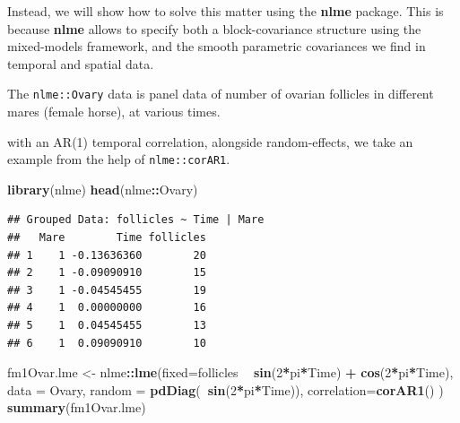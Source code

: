 \documentclass[]{book}
\newenvironment{Shaded}{\begin{snugshade}}{\end{snugshade}}
\newcommand{\DataTypeTok}[1]{\textcolor[rgb]{0.13,0.29,0.53}{#1}}
\newcommand{\DecValTok}[1]{\textcolor[rgb]{0.00,0.00,0.81}{#1}}
\newcommand{\KeywordTok}[1]{\textcolor[rgb]{0.13,0.29,0.53}{\textbf{#1}}}
\newcommand{\NormalTok}[1]{#1}
\newcommand{\OperatorTok}[1]{\textcolor[rgb]{0.81,0.36,0.00}{\textbf{#1}}}
\newcommand{\StringTok}[1]{\textcolor[rgb]{0.31,0.60,0.02}{#1}}
\theoremstyle{definition}
\theoremstyle{definition}
\theoremstyle{definition}
\theoremstyle{remark}
\begin{document}
Instead, we will show how to solve this matter using the \textbf{nlme} package.
This is because \textbf{nlme} allows to specify both a block-covariance structure using the mixed-models framework, and the smooth parametric covariances we find in temporal and spatial data.

The \texttt{nlme::Ovary} data is panel data of number of ovarian follicles in different mares (female horse), at various times.

with an AR(1) temporal correlation, alongside random-effects, we take an example from the help of \texttt{nlme::corAR1}.

\begin{Shaded}
\begin{Highlighting}[]
\KeywordTok{library}\NormalTok{(nlme)}
\KeywordTok{head}\NormalTok{(nlme}\OperatorTok{::}\NormalTok{Ovary)}
\end{Highlighting}
\end{Shaded}

\begin{verbatim}
## Grouped Data: follicles ~ Time | Mare
##   Mare        Time follicles
## 1    1 -0.13636360        20
## 2    1 -0.09090910        15
## 3    1 -0.04545455        19
## 4    1  0.00000000        16
## 5    1  0.04545455        13
## 6    1  0.09090910        10
\end{verbatim}

\begin{Shaded}
\begin{Highlighting}[]
\NormalTok{fm1Ovar.lme <-}\StringTok{ }\NormalTok{nlme}\OperatorTok{::}\KeywordTok{lme}\NormalTok{(}\DataTypeTok{fixed=}\NormalTok{follicles }\OperatorTok{~}\StringTok{ }\KeywordTok{sin}\NormalTok{(}\DecValTok{2}\OperatorTok{*}\NormalTok{pi}\OperatorTok{*}\NormalTok{Time) }\OperatorTok{+}\StringTok{ }\KeywordTok{cos}\NormalTok{(}\DecValTok{2}\OperatorTok{*}\NormalTok{pi}\OperatorTok{*}\NormalTok{Time), }
                   \DataTypeTok{data =}\NormalTok{ Ovary, }
                   \DataTypeTok{random =} \KeywordTok{pdDiag}\NormalTok{(}\OperatorTok{~}\KeywordTok{sin}\NormalTok{(}\DecValTok{2}\OperatorTok{*}\NormalTok{pi}\OperatorTok{*}\NormalTok{Time)), }
                   \DataTypeTok{correlation=}\KeywordTok{corAR1}\NormalTok{() )}
\KeywordTok{summary}\NormalTok{(fm1Ovar.lme)}
\end{Highlighting}
\end{Shaded}
\end{document}
